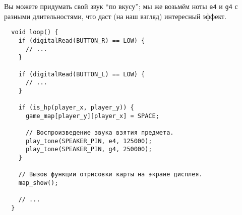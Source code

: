 \documentclass[../sparc.tex]{subfiles}
\begin{document}
Вы можете придумать свой звук ``по вкусу''; мы же возьмём ноты \texttt{e4} и
\texttt{g4} с разными длительностями, что даст (на наш взгляд) интересный
эффект.

\begin{verbatim}
  void loop() {
    if (digitalRead(BUTTON_R) == LOW) {
      // ...
    }

    if (digitalRead(BUTTON_L) == LOW) {
      // ...
    }

    if (is_hp(player_x, player_y)) {
      game_map[player_y][player_x] = SPACE;

      // Воспроизведение звука взятия предмета.
      play_tone(SPEAKER_PIN, e4, 125000);
      play_tone(SPEAKER_PIN, g4, 250000);
    }

    // Вызов функции отрисовки карты на экране дисплея.
    map_show();

    // ...
  }
\end{verbatim}
\end{document}

